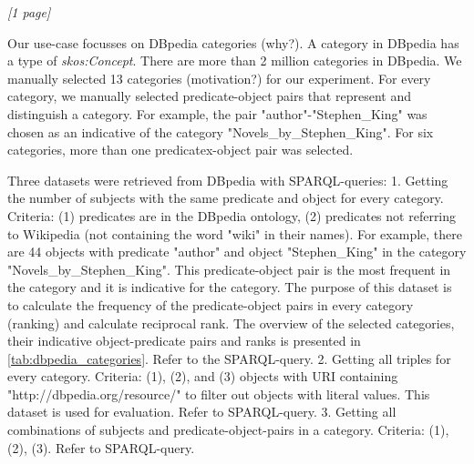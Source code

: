 \textit{[1 page]}

\noindent
Our use-case focusses on DBpedia categories (why?). A category in DBpedia has a type of \textit{skos:Concept}.
There are more than 2 million categories in DBpedia. We manually selected 13 categories (motivation?) for our experiment. For every category, we manually selected predicate-object pairs that represent and distinguish a category. For example, the pair "author"-"Stephen\_King" was chosen as an indicative of the category "Novels\_by\_Stephen\_King". For six categories, more than one predicatex-object pair was selected. 

Three datasets were retrieved from DBpedia with SPARQL-queries:
1. Getting the number of subjects with the same predicate and object for every category.
Criteria: (1) predicates are in the DBpedia ontology, (2) predicates not referring to Wikipedia (not containing the word "wiki" in their names).
For example, there are 44 objects with predicate "author" and object "Stephen\_King" in the category "Novels\_by\_Stephen\_King".
This predicate-object pair is the most frequent in the category and it is indicative for the category.
The purpose of this dataset is to calculate the frequency of the predicate-object pairs in every category (ranking) and calculate reciprocal rank. The overview of the selected categories, their indicative object-predicate pairs and ranks is presented in \ref{tab:dbpedia_categories}. Refer to the SPARQL-query. 
2. Getting all triples for every category. Criteria: (1), (2), and (3) objects with URI containing "http://dbpedia.org/resource/" to filter out objects with literal values.
This dataset is used for evaluation. Refer to SPARQL-query.
3. Getting all combinations of subjects and predicate-object-pairs in a category. Criteria: (1), (2), (3). Refer to SPARQL-query.


